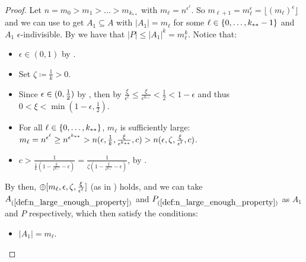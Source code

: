 \begin{lemma}[Claim 4.21]
\begin{proof}
            Let $n = m_0 > m_1 > \dots > m_{k_{**}}$ with $m_\ell = n^{\epsilon^{\ell}}$.
            So $m_{\ell+1} = m_\ell^\epsilon = \lfloor (m_\ell)^\epsilon \rfloor$ and we can use 
            to get $A_1 \subseteq A$ with $|A_1| = m_\ell$ for some $\ell \in \{ 0, \dots, k_{**}-1 \}$ and $A_1$ $\epsilon$-indivisible.
            By  we have that $|P| \leq |A_1|^k = m_\ell^k$.
            Notice that:
            \begin{itemize}
                \item $\epsilon \in (0,1)$ by .
                \item Set $\zeta \coloneqq \frac{1}{k} > 0$.
                \item Since $\epsilon \in ( 0, \frac{1}{2} )$ by ,
                    then by 
                    $\frac{\xi}{\epsilon^\ell} \leq \frac{\xi}{\epsilon^{k_{**}}} < \frac{1}{2} < 1 - \epsilon$ and
                    thus $0 < \xi < \min(1-\epsilon, \frac{1}{2})$.
                \item For all $\ell \in \{ 0,\dots,k_{**} \}$, $m_\ell$ is sufficiently large:
                    $m_\ell = n^{\epsilon^\ell} \geq n^{\epsilon^{k_{**}}} > n( \epsilon, \frac{1}{k},
                    \frac{\xi}{\epsilon^{k_{**}}}, c ) > n( \epsilon, \zeta, \frac{\xi}{\epsilon^{\ell}}, c )$.
                \item $c > \frac{1}{\frac{1}{k} (1 - \frac{\xi}{\epsilon^{k_{**}}} - \epsilon)}
                    = \frac{1}{\zeta (1 - \frac{\xi}{\epsilon^{k_{**}}} - \epsilon)}$, by .
            \end{itemize}
            By  then, $\oplus[ m_\ell, \epsilon, \zeta, \frac{\xi}{\epsilon^\ell} ]$
            (as in ) holds, and we can take
            $A_{(\ref{def:n_large_enough_property})}$ and $P_{(\ref{def:n_large_enough_property})}$ as $A_1$ and $P$
            respectively, which then satisfy the conditions:
            \begin{itemize}
                \item $|A_1| = m_\ell$.

\end{itemize}
\end{proof}
\end{lemma}
